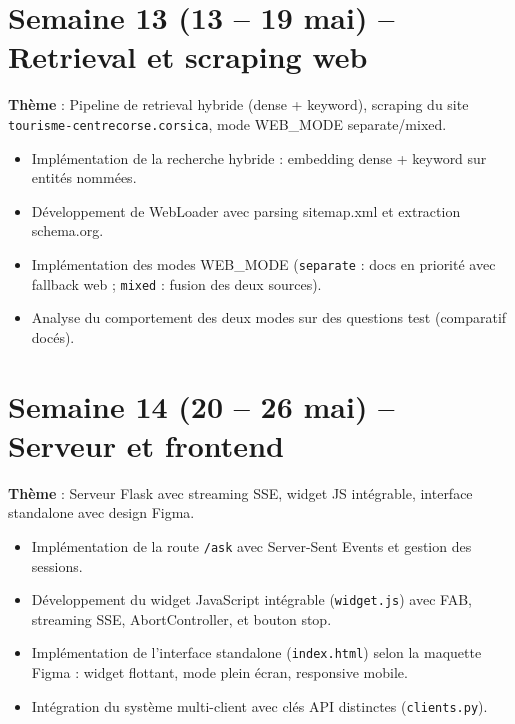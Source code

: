 \documentclass[12pt,a4paper]{report}
\begin{document}
\section{Semaine 13 (13 -- 19 mai) -- Retrieval et scraping web}
\begin{infobox}
\textbf{Th\`{e}me} : Pipeline de retrieval hybride (dense + keyword), scraping du site
\texttt{tourisme-centrecorse.corsica}, mode WEB\_MODE separate/mixed.
\end{infobox}
\begin{itemize}[leftmargin=*]
  \item Impl\'{e}mentation de la recherche hybride : embedding dense + keyword sur entit\'{e}s nomm\'{e}es.
  \item D\'{e}veloppement de WebLoader avec parsing sitemap.xml et extraction schema.org.
  \item Impl\'{e}mentation des modes WEB\_MODE (\texttt{separate} : docs en priorit\'{e} avec fallback web ;
        \texttt{mixed} : fusion des deux sources).
  \item Analyse du comportement des deux modes sur des questions test (comparatif doc\'{e}s).
\end{itemize}

\section{Semaine 14 (20 -- 26 mai) -- Serveur et frontend}
\begin{infobox}
\textbf{Th\`{e}me} : Serveur Flask avec streaming SSE, widget JS int\'{e}grable, interface
standalone avec design Figma.
\end{infobox}
\begin{itemize}[leftmargin=*]
  \item Impl\'{e}mentation de la route \texttt{/ask} avec Server-Sent Events et gestion des sessions.
  \item D\'{e}veloppement du widget JavaScript int\'{e}grable (\texttt{widget.js}) avec
        FAB, streaming SSE, AbortController, et bouton stop.
  \item Impl\'{e}mentation de l'interface standalone (\texttt{index.html}) selon la maquette
        Figma : widget flottant, mode plein \'{e}cran, responsive mobile.
  \item Int\'{e}gration du syst\`{e}me multi-client avec clés API distinctes (\texttt{clients.py}).
\end{itemize}
\end{document}
